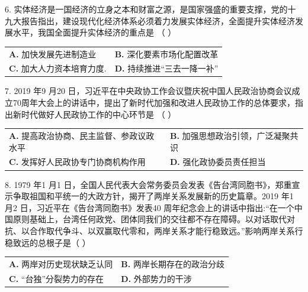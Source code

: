 \documentclass[UTF8,11pt]{ctexart}
\begin{document}
6. 实体经济是一国经济的立身之本和财富之源，是国家强盛的重要支撑，党的十九大报告指出，建设现代化经济体系必须着力发展实体经济，全面提升实体经济发展水平，我国全面提升实体经济的重点是 （    ）


\begin{center}\begin{tabular}{>{\raggedright\arraybackslash}p{\dimexpr(\linewidth-4\tabcolsep)/2\relax}>{\raggedright\arraybackslash}p{\dimexpr(\linewidth-4\tabcolsep)/2\relax}}
\textbf{A.} 加快发展先进制造业 & \textbf{B.} 深化要素市场化配置改革\\[.35em]
\textbf{C.} 加大人力资本培育力度. & \textbf{D.} 持续推进“三去一降一补”\\[.35em]\end{tabular}\end{center}

7. 2019 年9 月20 日，习近平在中央政协工作会议暨庆祝中国人民政治协商会议成立70周年大会上的讲话中，提出了新时代加强和改进人民政协工作的总体要求，指出新时代做好人民政协工作的中心环节是 （    ）


\begin{center}\begin{tabular}{>{\raggedright\arraybackslash}p{\dimexpr(\linewidth-4\tabcolsep)/2\relax}>{\raggedright\arraybackslash}p{\dimexpr(\linewidth-4\tabcolsep)/2\relax}}
\textbf{A.} 提高政治协商、民主监督、参政议政水平 & \textbf{B.} 加强思想政治引领，广泛凝聚共识\\[.35em]
\textbf{C.} 发挥好人民政协专门协商机构作用 & \textbf{D.} 强化政协委员责任担当\\[.35em]\end{tabular}\end{center}

8. 1979 年1 月1 日，全国人民代表大会常务委员会发表《告台湾同胞书》，郑重宣示争取祖国和平统一的大政方针，揭开了两岸关系发展新的历史篇章。2019 年1 月2 日，习近平在《告台湾同胞书》发表40 周年纪念会上的讲话中指出:“在一个中国原则基础上，台湾任何政党、团体同我们的交往都不存在障碍。以对话取代对抗、以合作取代争斗、以双赢取代零和，两岸关系才能行稳致远。”影响两岸关系行稳致远的总根子是（    ）


\begin{center}\begin{tabular}{>{\raggedright\arraybackslash}p{\dimexpr(\linewidth-4\tabcolsep)/2\relax}>{\raggedright\arraybackslash}p{\dimexpr(\linewidth-4\tabcolsep)/2\relax}}
\textbf{A.} 两岸对历史现状缺乏认同 & \textbf{B.} 两岸长期存在的政治分歧\\[.35em]
\textbf{C.} “台独”分裂势力的存在 & \textbf{D.} 外部势力的干涉\\[.35em]\end{tabular}\end{center}
\end{document}
